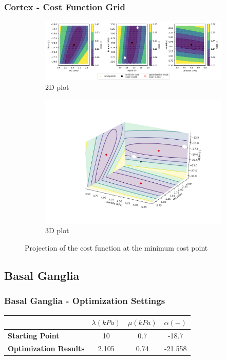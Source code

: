 \documentclass{beamer}
\begin{document}
\begin{frame}
\frametitle{Cortex - Cost Function Grid}
\begin{figure}[h!]
\centering
\begin{subfigure}[t]{0.6\linewidth}
\centering
\includegraphics[width = 1.\linewidth, trim = 80 00 50 00]
{Pictures/CortexMinPointProjection}
\caption{2D plot}
\end{subfigure}%
\begin{subfigure}[t]{0.4\linewidth}
\centering
\includegraphics[width = 1.\textwidth, trim = 50 50 80 50]
{Pictures/CortexMinPointProjection3D}
\caption{3D plot}
\end{subfigure}
\caption{Projection of the cost function at the minimum cost point}
\end{figure}
\end{frame}

\subsection{Basal Ganglia}
\begin{frame}
\frametitle{Basal Ganglia - Optimization Settings}
	\begin{table}[h!]
	\centering
		\begin{tabular}{lccc}
		\toprule
		& \textbf{$\lambda (kPa)$} & \textbf{$\mu (kPa)$} & \textbf{$\alpha (-)$}\\
		\midrule
		\textbf{Starting Point} & 10 & 0.7 & -18.7 \\
		\textbf{Optimization Results} & 2.105 & 0.74 & -21.558 \\
		\bottomrule
		\end{tabular}
	\end{table}
\end{frame}
\end{document}
